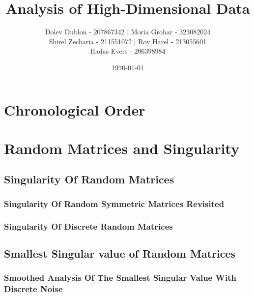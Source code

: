 \documentclass[12pt]{article}
\title{\textbf{Analysis of High-Dimensional Data}}
\author{
    Dolev Dublon - 207867342 |
    Moria Grohar - 323082024 \\
    Shirel Zecharia - 211551072 | 
    Roy Harel - 213055601 \\
    Hadas Evers - 206398984  
}
\date{\today}
\begin{document}
\maketitle


\tableofcontents

\newpage





\section{Chronological Order}



\section{Random Matrices and Singularity}





\subsection{Singularity Of Random Matrices}

\subsubsection{Singularity Of Random Symmetric Matrices Revisited}



\subsubsection{Singularity Of Discrete Random Matrices}




\subsection{Smallest Singular value of Random Matrices}



\subsubsection{Smoothed Analysis Of The Smallest Singular Value With Discrete Noise}
\end{document}
